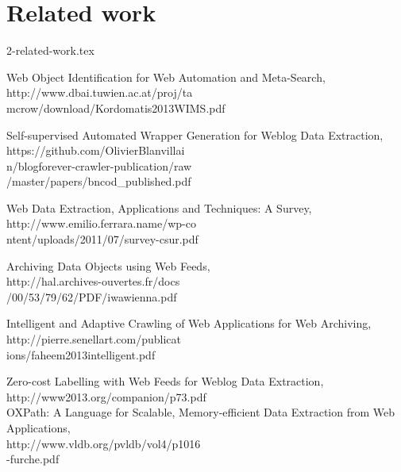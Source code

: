 \section{Related work}
2-related-work.tex

Web Object Identification for Web Automation and Meta-Search,
\\
http://www.dbai.tuwien.ac.at/proj/ta\\
mcrow/download/Kordomatis2013WIMS.pdf

Self-supervised Automated Wrapper Generation for Weblog Data Extraction,
\\
https://github.com/OlivierBlanvillai\\
n/blogforever-crawler-publication/raw\\
/master/papers/bncod\_published.pdf

Web Data Extraction, Applications and Techniques: A Survey,
\\
http://www.emilio.ferrara.name/wp-co\\
ntent/uploads/2011/07/survey-csur.pdf

Archiving Data Objects using Web Feeds,
\\
http://hal.archives-ouvertes.fr/docs\\
/00/53/79/62/PDF/iwawienna.pdf

Intelligent and Adaptive Crawling of Web Applications for Web Archiving,
\\
http://pierre.senellart.com/publicat\\
ions/faheem2013intelligent.pdf

Zero-cost Labelling with Web Feeds for Weblog Data Extraction,
\\
http://www2013.org/companion/p73.pdf\\


OXPath: A Language for Scalable, Memory-efficient Data Extraction from Web Applications,
\\
http://www.vldb.org/pvldb/vol4/p1016\\
-furche.pdf

